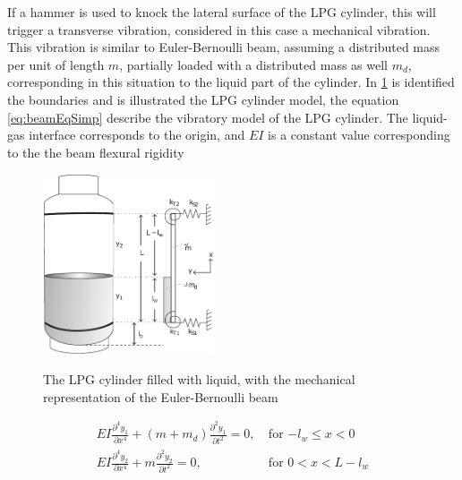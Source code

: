 If a hammer is used to knock the lateral surface of the LPG cylinder, this will trigger a transverse vibration, considered in this case a mechanical vibration. This vibration is similar to Euler-Bernoulli beam, assuming a distributed mass per unit of length $m$, partially loaded with a distributed mass as well $m_d$, corresponding in this situation to the liquid part of the cylinder. In \ref{fig:mechanicalmodel} is identified the boundaries and is illustrated the LPG cylinder model, the  equation \ref{eq:beamEqSimp} describe the vibratory model of the LPG cylinder. The liquid-gas interface corresponds to the origin, and $EI$ is a constant value corresponding to the the beam flexural rigidity
\begin{figure}[!htb]
    \centering
    \includegraphics[width=0.45\textwidth]{Chapters/2CHP/Diagrams/mathmodelLPG.pdf}
    \caption{The LPG cylinder filled with liquid, with the mechanical representation of the Euler-Bernoulli beam}{\cite{wuLiquidLevelDetector2014b}}
    \label{fig:mechanicalmodel}
\end{figure}
\begin{equation} \label{eq:beamEqSimp}
    \begin{split}
        EI\frac{\partial^4y_1}{\partial x^4} + (m + m_d)\frac{\partial^2y_1}{\partial t^2} = 0,\> & \text{for $-l_w \leq x < 0$} \\
        EI\frac{\partial^4y_2}{\partial x^4} + m\frac{\partial^2y_2}{\partial t^2} = 0,\> & \text{for $0 < x < L-l_w$}
    \end{split}
\end{equation}


